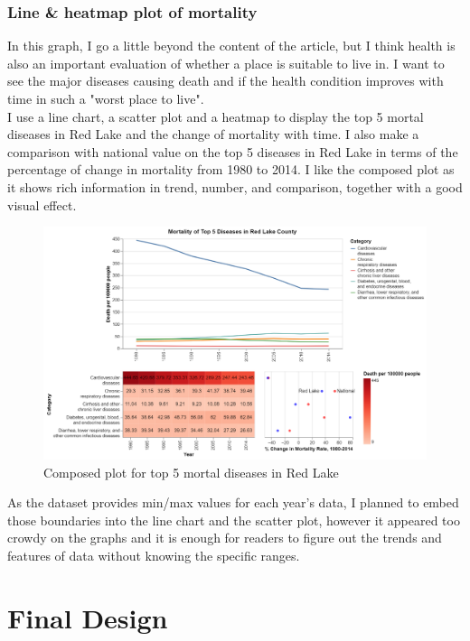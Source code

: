 \documentclass{article}
\begin{document}
\subsubsection*{Line \& heatmap plot of mortality}

In this graph, I go a little beyond the content of the article, but I think health is also an important evaluation of whether a place is suitable to live in. I want to see the major diseases causing death and if the health condition improves with time in such a "worst place to live". \\
\noindent
I use a line chart, a scatter plot and a heatmap to display the top 5 mortal diseases in Red Lake and the change of mortality with time. I also make a comparison with national value on the top 5 diseases in Red Lake in terms of the percentage of change in mortality from 1980 to 2014. I like the composed plot as it shows rich information in trend, number, and comparison, together with a good visual effect. \\
\begin{figure}[htbp]
    \centering
    \includegraphics[scale=0.3]{MT.png}
    \caption{Composed plot for top 5 mortal diseases in Red Lake}
\end{figure}
\newpage
\noindent
As the dataset provides min/max values for each year's data, I planned to embed those boundaries into the line chart and the scatter plot, however it appeared too crowdy on the graphs and it is enough for readers to figure out the trends and features of data without knowing the specific ranges.

\section{Final Design}
\end{document}
